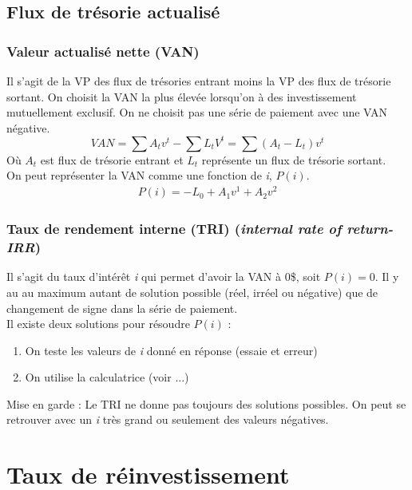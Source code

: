 \documentclass[11pt,french]{report}
\begin{document}
\subsection{Flux de trésorie actualisé}
\label{sub:flux trésorie}

\subsubsection{Valeur actualisé nette (VAN)}
\label{sub:sub:VAN}

Il s'agit de la VP des flux de trésories entrant moins la VP des flux de trésorie sortant. On choisit la VAN la plus élevée lorsqu'on à des investissement mutuellement exclusif. On ne choisit pas une série de paiement avec une VAN négative. 
\begin{equation}
VAN = \sum A_tv^t - \sum L_tV^t = \sum(A_t-L_t)v^t
\end{equation}
Où $A_t$ est flux de trésorie entrant et $L_t$ représente un flux de trésorie sortant.
\\ On peut représenter la VAN comme une fonction de \textit{i}, $P(i)$.
\begin{align*}
P(i) = -L_0 + A_1v^1 + A_2v^2
\end{align*}

\subsubsection{Taux de rendement interne (TRI) (\emph{internal rate of return-IRR})}
\label{IRR}

Il s'agit du taux d'intérêt \textit{i} qui permet d'avoir la VAN à 0\$, soit $P(i) = 0$. Il y au au maximum autant de solution possible (réel, irréel ou négative) que de changement de signe dans la série de paiement.
\\ 
Il existe deux solutions pour résoudre $P(i)$ :
\begin{enumerate}
\item On teste les valeurs de \emph{i} donné en réponse (essaie et erreur)
\item On utilise la calculatrice (voir ...)
\end{enumerate}
Mise en garde : Le TRI ne donne pas toujours des solutions possibles. On peut se retrouver avec un \textit{i} très grand ou seulement des valeurs négatives.

\section{Taux de réinvestissement}
\label{sec:Taux reinvestissement}
\end{document}
